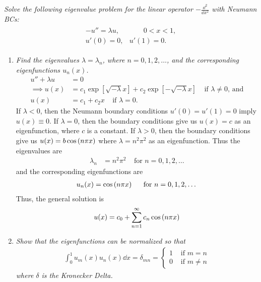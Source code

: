 \documentclass[fontsize=11pt]{article} %
\theoremstyle{plain}
\numberwithin{equation}{section} %
\numberwithin{figure}{section} %
\numberwithin{table}{section} %
\begin{document}
\emph{Solve the following eigenvalue problem for the linear operator $-\frac{\dd^2}{\dd x^2}$ with Neumann BCs:}
\begin{align*}
    \begin{array}{rr}
        -u'' = \lambda u, & \qquad 0 < x < 1, \\
        u'(0) = 0, & u'(1) = 0.
    \end{array}
\end{align*}
\begin{enumerate}[\bf (a)]
    \item 
        \emph{Find the eigenvalues $\lambda = \lambda_n$, where $n = 0, 1, 2, \dots$, and the corresponding eigenfunctions $u_n(x)$.}
        \begin{align*}
            u'' + \lambda u &= 0 \\
            \implies u(x) &= c_1\exp[\sqrt{-\lambda}x] + c_2\exp[-\sqrt{-\lambda}x]\ \ \ \ \ \text{if $\lambda \neq 0$, and} \\
            u(x) &= c_1 + c_2 x\ \ \ \ \ \text{if $\lambda = 0$.}
        \end{align*}
        If $\lambda < 0$, then the Neumann boundary conditions $u'(0) = u'(1) = 0$ imply $u(x) \equiv 0$.  If $\lambda = 0$, then the boundary conditions give us $u(x) = c$ as an eigenfunction, where $c$ is a constant.  If $\lambda > 0$, then the boundary conditions give us $u(x) = b\cos\qty(n\pi x)$ where $\lambda = n^2\pi^2$ as an eigenfunction.  Thus the eigenvalues are
        \begin{align*}
        \lambda_n &= n^2\pi^2\ \ \ \ \ \text{for $n = 0, 1, 2, \dots$}
        \end{align*}
        and the corresponding eigenfunctions are
        \begin{align*}
            u_n(x) = \cos\qty(n\pi x)\ \ \ \ \ \text{for $n = 0, 1, 2, \dots$}
        \end{align*}
        Thus, the general solution is
        \begin{align*}
            u(x) = c_0 + \sum_{n=1}^\infty c_n \cos\qty(n\pi x)
        \end{align*}
    \item
        \emph{Show that the eigenfunctions can be normalized so that}
        \begin{align*}
            \int_0^1 u_m(x) u_n(x) \dd x = \delta_{mn} = \begin{cases}
                1 & \text{ if }m = n \\
                0 & \text{ if }m \neq n
            \end{cases}
        \end{align*}
        \emph{where $\delta$ is the Kronecker Delta.} \\


\end{enumerate}
\end{document}
